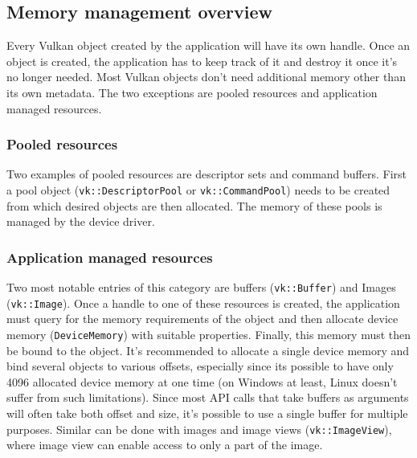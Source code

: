 \documentclass[times, utf8, zavrsni, numeric]{fer}
\begin{document}
\subsection{Memory management overview}
Every Vulkan object created by the application will have its own handle. Once an object is created, the application has to keep track of it and destroy it once it's no longer needed. Most Vulkan objects don't need additional memory other than its own metadata. The two exceptions are pooled resources and application managed resources.

\subsubsection{Pooled resources}
Two examples of pooled resources are descriptor sets and command buffers. First a pool object (\texttt{vk::DescriptorPool} or \texttt{vk::CommandPool}) needs to be created from which desired objects are then allocated. The memory of these pools is managed by the device driver.

\subsubsection{Application managed resources}
Two most notable entries of this category are buffers (\texttt{vk::Buffer}) and Images (\texttt{vk::Image}). Once a handle to one of these resources is created, the application must query for the memory requirements of the object and then allocate device memory (\texttt{DeviceMemory}) with suitable properties. Finally, this memory must then be bound to the object. It's recommended to allocate a single device memory and bind several objects to various offsets, especially since its possible to have only 4096 allocated device memory at one time (on Windows at least, Linux doesn't suffer from such limitations). Since most API calls that take buffers as arguments will often take both offset and size, it's possible to use a single buffer for multiple purposes. Similar can be done with images and image views (\texttt{vk::ImageView}), where image view can enable access to only a part of the image.
\end{document}
